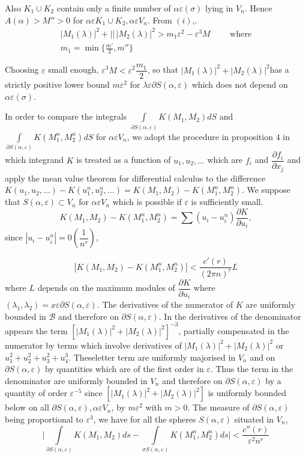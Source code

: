 Also $K_1 \cup K_2$ contain only a finite number of $\alpha
\varepsilon (\sigma)$ lying in $V_n$. Hence $A(\alpha)>M'' >0$ for
$\alpha \varepsilon  
K_1 \cup K_2, \alpha \varepsilon  V_n$. From $(i)$,. 
\begin{gather*}
  |M_1(\lambda)|^2 +||\, |M_2(\lambda)|^2 > m_1 \varepsilon ^2
  -\varepsilon ^3 M \qquad  \text{ where}\\ 
  m_1= \min \bigg \{ \frac{m'}{2}, m'' \bigg \}
\end{gather*}

Choosing $\varepsilon $ small enough, $\varepsilon ^3 M < \varepsilon
^2 \dfrac{m_1}{2}$, so that 
$|M_1 (\lambda)|^2 +| M_2 (\lambda)|^2$\pageoriginale has a strictly positive lower
bound $m \varepsilon ^2$ for $\lambda \varepsilon  \partial S(\alpha,
\varepsilon )$ which does 
not depend on $\alpha \varepsilon  (\sigma)$. 

In order to compare the integrals $\int\limits _{\partial S (\alpha,
  \varepsilon )} K(M_1, M_2)dS$ and \break $\int\limits_{\partial S (\alpha,
  \varepsilon )}K(M^n_1, M^n_2)dS$ for $\alpha \varepsilon  V_n$, we adopt the procedure
in proposition $4$ in which integrand $K$ is treated as a function of
$u_1,u_2, \ldots$ which are $f_i$ and $\dfrac{\partial f_i}{\partial
  x_j}$ and apply the mean value theorem for differential calculus to
the difference $K(u_1,u_2, \ldots)-K(u^n_1,u^n_2,
\ldots)=K(M_1,M_2)- K (M_1^n, M_2^n)$. We suppose that $S(\alpha,
\varepsilon )\subset V_n$ for 
$\alpha \varepsilon  V_n$ which is possible if $\varepsilon $ is sufficiently small. 
$$
K(M_1,M_2)-K(M^n_1,M^n_2)=\sum (u_i -u_i^n)\frac{\partial K}{\partial
  u_i}, 
$$
since $|u_i -u_i^n|=0\left(\dfrac{1}{n^r}\right)$,

$$|K(M_1,M_2)-K(M^n_1,M^n_2)|< \dfrac{c'(r)}{(2 \pi n)^r}L$$ 
where $L$
depends on the maximum modules of $\dfrac{\partial K}{\partial u_i}$
where $(\lambda_1, \lambda_2)=x \varepsilon  \partial S(\alpha, \varepsilon )$. The
derivatives of the numerator of $K$ are uniformly boun\-ded in $\mathscr{B}$
and therefore on $\partial S(\alpha, \varepsilon )$. In the derivatives of the
denominator appears the term  $\left [ |M_1 (\lambda)|^2+|M_2
  (\lambda)|^2 \right ]^{-3}$, partially compensated in the numerator
by terms which involve derivatives of $|M_1 (\lambda)|^2+|M_2
(\lambda)|^2$ or $u^2_1+u^2_2+u^2_3+u^3_4$. These\pageoriginale letter term are
uniformly majorised in $V_n$ and on $\partial S(\alpha,  \varepsilon )$ by
quantities which are of the first order in $\varepsilon $. Thus the term in the
denominator are uniformly bounded in $V_n$ and therefore on $\partial
S(\alpha, \varepsilon )$ by a quantity of order $\varepsilon^{-5}$ since $[|M_1
  (\lambda)|^2+|M_2 (\lambda)|^2]$ is uniformly bounded below on all
$\partial S(\alpha, \varepsilon ), \alpha \varepsilon  V_n$, by $m
\varepsilon^2$ with $m>0$. The 
measure of $\partial S(\alpha, \varepsilon )$ being proportional to
$\varepsilon ^3$, we 
have for all the spheres $S(\alpha, \varepsilon )$ situated in $V_n$, 
$$
\bigg|\int\limits_{\partial S(\alpha, \varepsilon )} K(M_1,M_2)ds -\int 
\limits_{\sigma S(\alpha, \varepsilon )} K(M^n_1,M^n_2)ds \bigg|< \frac{c''
  (r)}{\varepsilon ^2 n^r} 
$$

